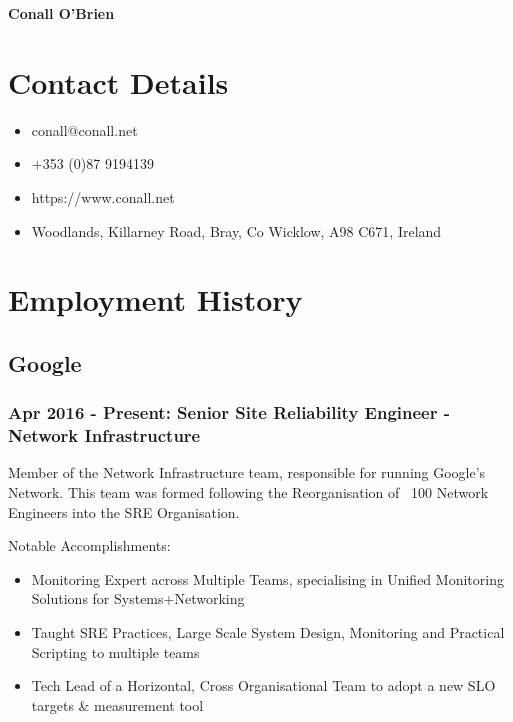 \documentclass[a4paper, 10pt] {article}
\begin{document}
\begingroup
  \centering
  \LARGE \textbf{Conall O'Brien}\\[1.5em]
\endgroup

\section*{Contact Details}

\begin{itemize}[itemsep=2pt,parsep=2pt]
 \item conall@conall.net
 \item +353 (0)87 9194139
 \item https://www.conall.net
 \item Woodlands, Killarney Road, Bray, Co Wicklow, A98 C671, Ireland
\end{itemize}

\section*{Employment History}

\subsection*{Google}

\subsubsection*{Apr 2016 - Present: Senior Site Reliability Engineer - Network Infrastructure}

Member of the Network Infrastructure team, responsible for running Google's Network. This team was formed
following the Reorganisation of ~100 Network Engineers into the SRE Organisation.

\vspace{5mm} %

Notable Accomplishments:

\begin{itemize}[itemsep=2pt,parsep=2pt]
  \item Monitoring Expert across Multiple Teams, specialising in Unified Monitoring Solutions for Systems+Networking
  \item Taught SRE Practices, Large Scale System Design, Monitoring and Practical Scripting to multiple teams
  \item Tech Lead of a Horizontal, Cross Organisational Team to adopt a new SLO targets \& measurement tool
\end{itemize}
\end{document}
